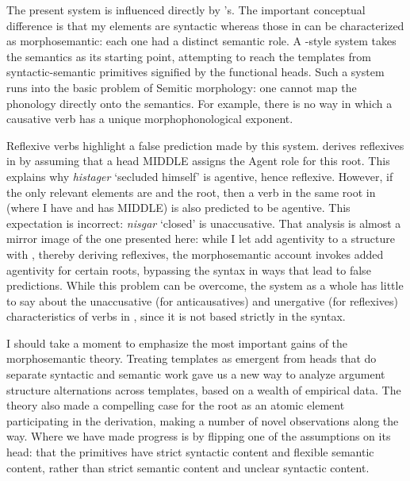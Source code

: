 The present system is influenced directly by \citeauthor{doron03}'s. The important conceptual difference is that my elements are syntactic whereas those in \cite{doron03} can be characterized as morphosemantic: each one had a distinct semantic role. A \citeauthor{doron03}-style system takes the semantics as its starting point, attempting to reach the templates from syntactic-semantic primitives signified by the functional heads. Such a system runs into the basic problem of Semitic morphology: one cannot map the phonology directly onto the semantics. For example, there is no way in which a causative verb has a unique morphophonological exponent.

Reflexive verbs highlight a false prediction made by this system. \citet[60]{doron03} derives reflexives in {\thit} by assuming that a head MIDDLE assigns the Agent role for this root. This explains why \emph{histager} `secluded himself' is agentive, hence reflexive. However, if the only relevant elements are {\vz} and the root, then a verb in the same root in {\tnif} (where I have {\vz} and \citealt{doron03} has MIDDLE) is also predicted to be agentive. This expectation is incorrect: \emph{nisgar} `closed' is unaccusative. That analysis is almost a mirror image of the one presented here: while I let {\va} add agentivity to a structure with \vz, thereby deriving reflexives, the morphosemantic account invokes added agentivity for certain roots, bypassing the syntax in ways that lead to false predictions. While this problem can be overcome, the system as a whole has little to say about the unaccusative (for anticausatives) and unergative (for reflexives) characteristics of verbs in {\thit}, since it is not based strictly in the syntax.

I should take a moment to emphasize the most important gains of the morphosemantic theory. Treating templates as emergent from heads that do separate syntactic and semantic work gave us a new way to analyze argument structure alternations across templates, based on a wealth of empirical data. The theory also made a compelling case for the root as an atomic element participating in the derivation, making a number of novel observations along the way. Where we have made progress is by flipping one of the assumptions on its head: that the primitives have strict syntactic content and flexible semantic content, rather than strict semantic content and unclear syntactic content.


